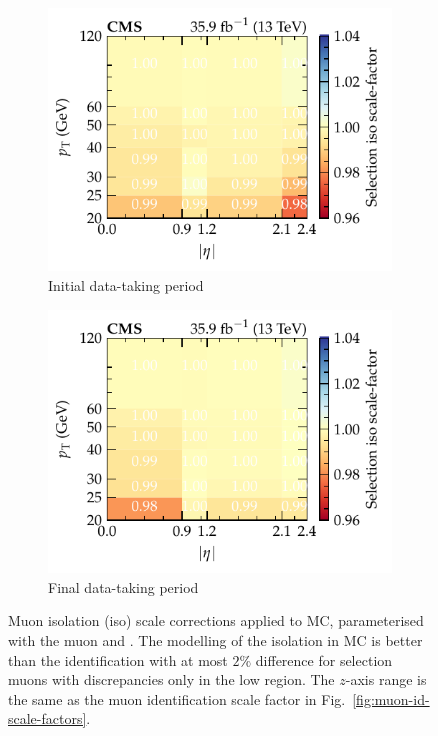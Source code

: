 \begin{figure}[htb]
    \\
    \begin{subfigure}[b]{0.49\textwidth}
        \centering
        \includegraphics{chapters/041_corrections/images/efficiencies/objects/muons/muon_iso_tight_runbf.pdf}
        \caption{Initial data-taking period}
        \label{subfigc:muon-iso-scale-factors}
    \end{subfigure}
    \hfill
    \begin{subfigure}[b]{0.49\textwidth}
        \centering
        \includegraphics{chapters/041_corrections/images/efficiencies/objects/muons/muon_iso_tight_rungh.pdf}
        \caption{Final data-taking period}
        \label{subfigd:muon-iso-scale-factors}
    \end{subfigure}
    \caption[Corrections to simulated muon isolation efficiencies.]{
        Muon isolation (iso) scale corrections applied to MC, parameterised with the muon \pt and \aeta. The modelling of the isolation in MC is better than the identification with at most $2\%$ difference for selection muons with discrepancies only in the low \pt region. The $z$-axis range is the same as the muon identification scale factor in Fig.~\ref{fig:muon-id-scale-factors}.
    }
    \label{fig:muon-iso-scale-factors}
\end{figure}


